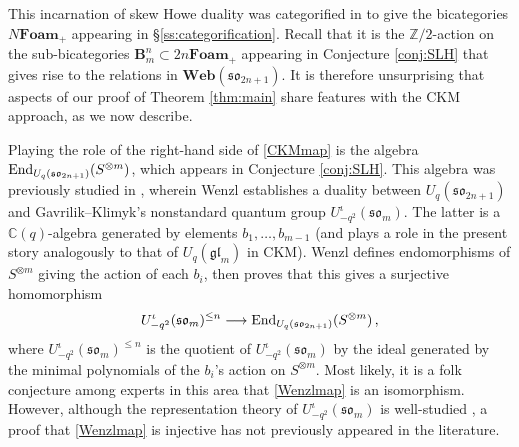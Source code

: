 \documentclass[10pt]{amsart}
\numberwithin{equation}{section}
\theoremstyle{definition}
\newcommand{\End}{{\rm End}}
\def\C{{\mathbb C}}
\def\Z{{\mathbb Z}}
\newcommand{\glm}{\mathfrak{gl}_{m}}
\newcommand{\son}[1][2n+1]{\mathfrak{so}_{#1}}
\newcommand{\som}[1][m]{\mathfrak{so}_{#1}}
\newcommand{\Web}{\mathbf{Web}}
\newcommand{\iqUsom}[1][m]{{U}^{\iota}_{-q^2}(\som[#1])}
\begin{document}
This incarnation of skew Howe duality was categorified in \cite{QR1} to 
give the bicategories $N\mathbf{Foam_+}$ appearing in \S \ref{ss:categorification}.
Recall that it is the $\Z/2$-action on the sub-bicategories 
$\mathbf{B}^n_m \subset 2n\mathbf{Foam_+}$ appearing in Conjecture \ref{conj:SLH}
that gives rise to the relations in $\Web(\son)$.
It is therefore unsurprising that aspects of our proof of Theorem \ref{thm:main} 
share features with the CKM approach, as we now describe.

Playing the role of the right-hand side of \eqref{CKMmap} is the algebra
$\End_{U_q(\son)}(S^{\otimes m})$, which appears in Conjecture \ref{conj:SLH}.
This algebra was previously studied in \cite{Wenzl-Spin}, 
wherein Wenzl establishes a duality between $U_q(\son)$ 
and Gavrilik--Klimyk's \cite{GK-Usom} nonstandard quantum group $\iqUsom$.
The latter is a $\C(q)$-algebra generated by elements $b_1, \dots, b_{m-1}$
(and plays a role in the present story analogously to that of $U_q(\glm)$ in CKM). 
Wenzl defines endomorphisms of $S^{\otimes m}$ giving the action of each $b_i$, 
then proves that this gives a surjective homomorphism
\begin{equation}\label{Wenzlmap} 
\iqUsom^{\le n} \longrightarrow \End_{U_q(\son)}(S^{\otimes m}) \, ,
\end{equation}
where $\iqUsom^{\le n}$ is the quotient of $\iqUsom$ by the ideal generated 
by the minimal polynomials of the $b_i$'s action on $S^{\otimes m}$. 
Most likely, it is a folk conjecture among experts in this area that \eqref{Wenzlmap} is an isomorphism.
However, although the representation theory of $\iqUsom$ is well-studied \cite{GK-Usom, WenzlUprime}, 
a proof that \eqref{Wenzlmap}  is injective has not previously appeared in the literature.
\end{document}
